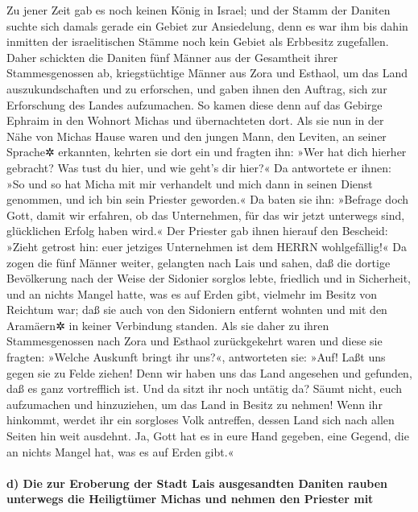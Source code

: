 Zu jener Zeit gab es noch keinen König in Israel; und der
Stamm der Daniten suchte sich damals gerade ein Gebiet zur Ansiedelung,
denn es war ihm bis dahin inmitten der israelitischen Stämme noch kein
Gebiet als Erbbesitz zugefallen. Daher schickten die
Daniten fünf Männer aus der Gesamtheit ihrer Stammesgenossen ab,
kriegstüchtige Männer aus Zora und Esthaol, um das Land
auszukundschaften und zu erforschen, und gaben ihnen den Auftrag, sich
zur Erforschung des Landes aufzumachen. So kamen diese denn auf das
Gebirge Ephraim in den Wohnort Michas und übernachteten dort.
Als sie nun in der Nähe von Michas Hause waren und den
jungen Mann, den Leviten, an seiner Sprache✲ erkannten, kehrten sie dort
ein und fragten ihn: »Wer hat dich hierher gebracht? Was tust du hier,
und wie geht's dir hier?« Da antwortete er ihnen: »So und
so hat Micha mit mir verhandelt und mich dann in seinen Dienst genommen,
und ich bin sein Priester geworden.« Da baten sie ihn:
»Befrage doch Gott, damit wir erfahren, ob das Unternehmen, für das wir
jetzt unterwegs sind, glücklichen Erfolg haben wird.« Der
Priester gab ihnen hierauf den Bescheid: »Zieht getrost hin: euer
jetziges Unternehmen ist dem HERRN wohlgefällig!« Da zogen
die fünf Männer weiter, gelangten nach Lais und sahen, daß die dortige
Bevölkerung nach der Weise der Sidonier sorglos lebte, friedlich und in
Sicherheit, und an nichts Mangel hatte, was es auf Erden gibt, vielmehr
im Besitz von Reichtum war; daß sie auch von den Sidoniern entfernt
wohnten und mit den Aramäern✲ in keiner Verbindung standen.
Als sie daher zu ihren Stammesgenossen nach Zora und
Esthaol zurückgekehrt waren und diese sie fragten: »Welche Auskunft
bringt ihr uns?«, antworteten sie: »Auf! Laßt uns gegen
sie zu Felde ziehen! Denn wir haben uns das Land angesehen und gefunden,
daß es ganz vortrefflich ist. Und da sitzt ihr noch untätig da? Säumt
nicht, euch aufzumachen und hinzuziehen, um das Land in Besitz zu
nehmen! Wenn ihr hinkommt, werdet ihr ein sorgloses Volk
antreffen, dessen Land sich nach allen Seiten hin weit ausdehnt. Ja,
Gott hat es in eure Hand gegeben, eine Gegend, die an nichts Mangel hat,
was es auf Erden gibt.«

\hypertarget{d-die-zur-eroberung-der-stadt-lais-ausgesandten-daniten-rauben-unterwegs-die-heiligtuxfcmer-michas-und-nehmen-den-priester-mit}{%
\paragraph{d) Die zur Eroberung der Stadt Lais ausgesandten Daniten
rauben unterwegs die Heiligtümer Michas und nehmen den Priester
mit}\label{d-die-zur-eroberung-der-stadt-lais-ausgesandten-daniten-rauben-unterwegs-die-heiligtuxfcmer-michas-und-nehmen-den-priester-mit}}

